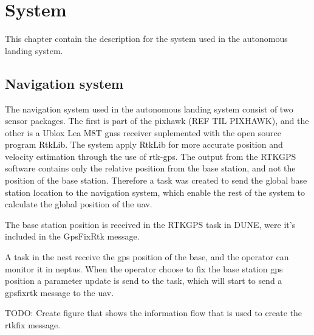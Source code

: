 \chapter{System}
This chapter contain the description for the system used in the autonomous landing system.
\section{Navigation system}
The navigation system used in the autonomous landing system consist of two sensor packages. The first is part of the pixhawk (REF TIL PIXHAWK), and the other is a Ublox Lea M8T \gls{gnss} receiver suplemented with the open source program RtkLib. The system apply RtkLib for more accurate position and velocity estimation through the use of \gls{rtk-gps}. The output from the RTKGPS software contains only the relative position from the base station, and not the position of the base station. Therefore a task was created to send the global base station location to the navigation system, which enable the rest of the system to calculate the global position of the uav.

The base station position is received in the RTKGPS task in DUNE, were it's included in the GpsFixRtk message.

A task in the nest receive the gps position of the base, and the operator can monitor it in neptus. When the operator choose to fix the base station gps position a parameter update is send to the task, which will start to send a gpsfixrtk message to the uav. 

TODO: Create figure that shows the information flow that is used to create the rtkfix message.
